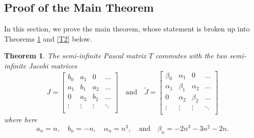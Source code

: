 \documentclass[11pt]{amsart}
\theoremstyle{plain}
\newtheorem{theorem}{Theorem}[section]
\theoremstyle{named}
\def \wt {\widetilde}
\begin{document}
\subsection{Proof of the Main Theorem}\label{proofMT}
In this section, we prove the main theorem, whose statement is broken up into Theorems \ref{T1} and \ref{T2} below.
\begin{theorem}\label{T1}
The semi-infinite Pascal matrix $T$ commutes with the two semi-infinite Jacobi matrices
$$
J = \left[\begin{array}{ccccc}
b_0 & a_1 &  0  & \dots \\
a_1 & b_1 & a_2 & \dots \\
 0  & a_2 & b_2 & \dots \\
\vdots & \vdots & \vdots & \ddots\\
\end{array}\right]
\quad\text{and}\quad
\wt J = \left[\begin{array}{cccc}
\beta_0 & \alpha_1 &  0  & \dots\\
\alpha_1 & \beta_1 & \alpha_2 & \dots\\
 0  & \alpha_2 & \beta_2 & \dots\\
\vdots & \vdots & \vdots & \ddots\\
\end{array}\right]
$$
where here
$$a_n = n,\quad b_n = -n,\quad \alpha_n = n^3,\quad\text{and}\quad \beta_n = -2n^3-3n^2-2n.$$ 
\end{theorem}
\end{document}
